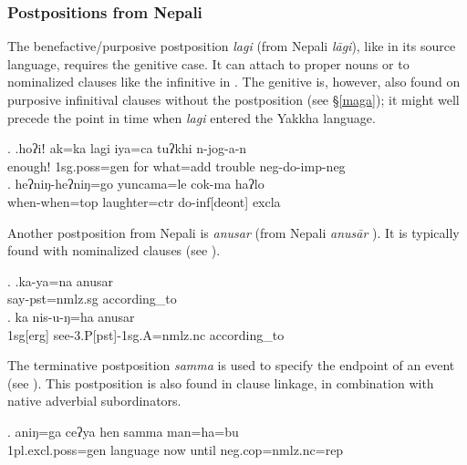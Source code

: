   
\subsubsection{Postpositions from Nepali}
  
The benefactive/purposive postposition \emph{lagi} (from Nepali  \emph{lāgi}), like in its source language, requires the genitive case. It can attach to proper nouns  or to nominalized clauses like the infinitive in \Next[b]. The genitive is, however, also found on purposive infinitival clauses without the postposition (see §\ref{maga}); it might well precede the point in time when \emph{lagi} entered the Yakkha language.

\ex. \ag.hoʔiǃ  ak=ka          lagi  iya=ca                       tuʔkhi n-jog-a-n\\
enough! {\sc 1sg.poss=gen} for what{\sc =add} trouble {\sc neg-}do{\sc -imp-neg}\\
 
 \bg.  heʔniŋ-heʔniŋ=go    yuncama=le           cok-ma       haʔlo\\
when-when{\sc =top} laughter{\sc =ctr} do{\sc -inf[deont]} {\sc excla}\\
 

Another postposition from Nepali is \emph{anusar}  (from Nepali \emph{anusār} ). It is typically found with nominalized clauses (see \Next).


\ex. \ag.ka-ya=na                   anusar\\
say{\sc [3sg]-pst=nmlz.sg} according\_to\\
 
\bg.  ka       nis-u-ŋ=ha                                  anusar\\
{\sc 1sg[erg]} see{\sc -3.P[pst]-1sg.A=nmlz.nc} according\_to\\
 

The terminative postposition \emph{samma}   is used to specify the endpoint of an event (see \Next). This postposition is also found in clause linkage, in combination with native adverbial subordinators.

\exg. aniŋ=ga            ceʔya   hen samma      man=ha=bu\\
{\sc 1pl.excl.poss=gen}  language now until {\sc neg.cop=nmlz.nc=rep}\\
 

